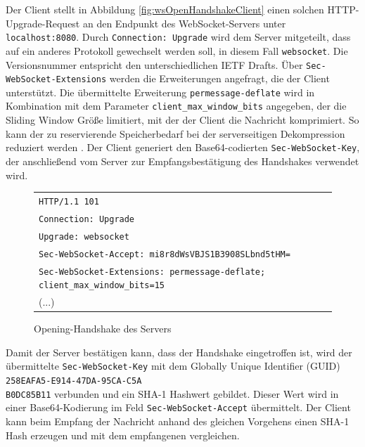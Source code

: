 \documentclass[11pt,a4paper,titlepage]{scrartcl}
\numberwithin{equation}{section}
\begin{document}
\noindent Der Client stellt in Abbildung \ref{fig:wsOpenHandshakeClient} einen solchen HTTP-Upgrade-Request an den Endpunkt des WebSocket-Servers unter \texttt{localhost:8080}. Durch \texttt{Connection: Upgrade} wird dem Server mitgeteilt, dass auf ein anderes Protokoll gewechselt werden soll, in diesem Fall \texttt{websocket}. Die Versionsnummer entspricht den unterschiedlichen IETF Drafts. Über \texttt{Sec-WebSocket-Extensions} werden die Erweiterungen angefragt, die der Client unterstützt. Die übermittelte Erweiterung \texttt{permessage-deflate} wird in Kombination mit dem Parameter \texttt{client\_max\_window\_bits} angegeben, der die Sliding Window Größe limitiert, mit der der Client die Nachricht komprimiert. So kann der zu reservierende Speicherbedarf bei der serverseitigen Dekompression reduziert werden \autocite[18]{yoshino_compression_2015}. Der Client generiert den Base64-codierten \texttt{Sec-WebSocket-Key}, der anschließend vom Server zur Empfangsbestätigung des Handshakes verwendet wird. 

\begin{figure}[ht]
	\begin{center}
		\begin{tabular}{l}
			\texttt{HTTP/1.1 101} \\
			\texttt{Connection: Upgrade} \\
			\texttt{Upgrade: websocket} \\
			\texttt{Sec-WebSocket-Accept: mi8r8dWsVBJS1B3908SLbnd5tHM=}\\
			\texttt{Sec-WebSocket-Extensions: permessage-deflate; client\_max\_window\_bits=15}\\
			(...)\vspace{-5mm}
		\end{tabular}
	\end{center}
	\caption{Opening-Handshake des Servers}
	\label{fig:wsOpenHandshakeServer}
\end{figure}

\noindent Damit der Server bestätigen kann, dass der Handshake eingetroffen ist, wird der  übermittelte \texttt{Sec-WebSocket-Key} mit dem Globally Unique Identifier (GUID) \texttt{258EAFA5-E914-47DA-95CA-C5A\\B0DC85B11} verbunden und ein SHA-1 Hashwert gebildet. Dieser Wert wird in einer Base64-Kodierung im Feld \texttt{Sec-WebSocket-Accept} übermittelt. Der Client kann beim Empfang der Nachricht anhand des gleichen Vorgehens einen SHA-1 Hash erzeugen und mit dem empfangenen vergleichen. 
\end{document}
